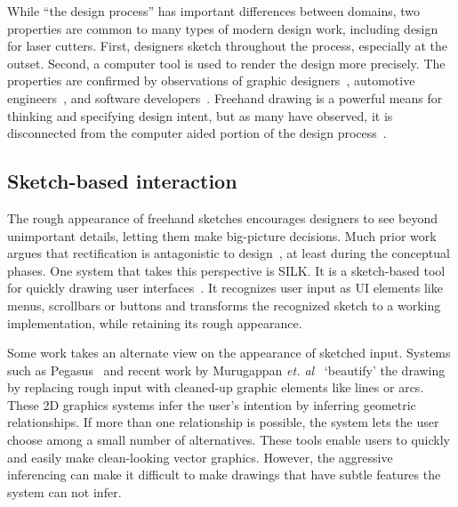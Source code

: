 \documentclass{article}
\begin{document}
While ``the design process'' has important differences between
domains, two properties are common to many types of modern design
work, including design for laser cutters. First, designers sketch
throughout the process, especially at the outset. Second, a computer
tool is used to render the design more precisely. The properties are
confirmed by observations of graphic
designers~\cite{wong-rr-prototypes}, automotive
engineers~\cite{kara-styling}, and software
developers~\cite{dekel-improvised-notation}. Freehand drawing is a
powerful means for thinking and specifying design intent, but as many
have observed, it is disconnected from the computer aided portion of
the design process~\cite{company-sketching-in-engineering}.

\subsection{Sketch-based interaction}

The rough appearance of freehand sketches encourages designers to see
beyond unimportant details, letting them make big-picture
decisions. Much prior work argues that rectification is antagonistic
to design~\cite{gross-cocktail}, at least during the conceptual
phases. One system that takes this perspective is SILK. It is a
sketch-based tool for quickly drawing user
interfaces~\cite{landay-silk-chi}. It recognizes user input as UI
elements like menus, scrollbars or buttons and transforms the
recognized sketch to a working implementation, while retaining its
rough appearance.


Some work takes an alternate view on the appearance of sketched
input. Systems such as Pegasus~\cite{igarashi-pegasus} and recent work
by Murugappan \textit{et. al}~\cite{murugappan-beautification}
`beautify' the drawing by replacing rough input with cleaned-up
graphic elements like lines or arcs. These 2D graphics systems infer
the user's intention by inferring geometric relationships. If more
than one relationship is possible, the system lets the user choose
among a small number of alternatives. These tools enable users to
quickly and easily make clean-looking vector graphics. However, the
aggressive inferencing can make it difficult to make drawings that
have subtle features the system can not infer.
\end{document}
